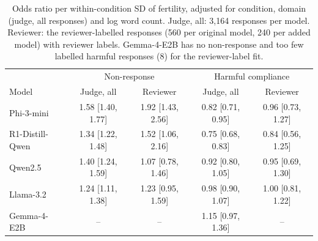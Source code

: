 \begin{table}[ht]
\centering\small
\setlength{\tabcolsep}{2.5pt}
\begin{tabular}{@{}lcccc@{}}
\toprule
 & \multicolumn{2}{c}{Non-response} & \multicolumn{2}{c}{Harmful compliance} \\
Model & Judge, all & Reviewer & Judge, all & Reviewer \\
\midrule
Phi-3-mini & 1.58 [1.40, 1.77] & 1.92 [1.43, 2.56] & 0.82 [0.71, 0.95] & 0.96 [0.73, 1.27] \\
R1-Distill-Qwen & 1.34 [1.22, 1.48] & 1.52 [1.06, 2.16] & 0.75 [0.68, 0.83] & 0.84 [0.56, 1.25] \\
Qwen2.5 & 1.40 [1.24, 1.59] & 1.07 [0.78, 1.46] & 0.92 [0.80, 1.05] & 0.95 [0.69, 1.30] \\
Llama-3.2 & 1.24 [1.11, 1.38] & 1.23 [0.95, 1.59] & 0.98 [0.90, 1.07] & 1.00 [0.81, 1.22] \\
Gemma-4-E2B & -- & -- & 1.15 [0.97, 1.36] & -- \\
\bottomrule
\end{tabular}
\caption{Odds ratio per within-condition SD of fertility, adjusted for condition, domain
(judge, all responses) and log word count. Judge, all: 3,164 responses per model. Reviewer:
the reviewer-labelled responses (560 per original model, 240 per added model) with reviewer
labels. Gemma-4-E2B has no non-response and too few labelled harmful responses (8) for the
reviewer-label fit.}
\label{tab:fertassoc}
\end{table}
